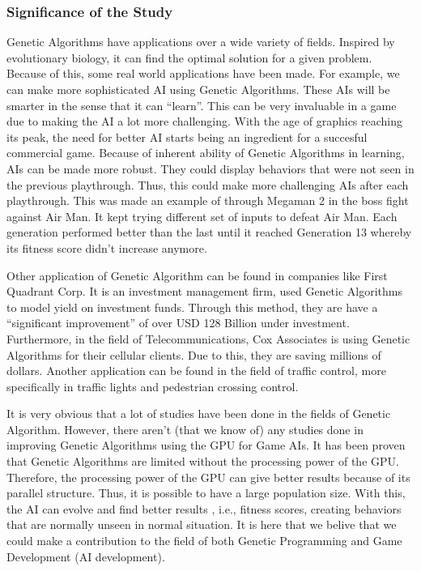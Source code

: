\subsubsection*{Significance of the Study}
Genetic Algorithms have applications over a wide variety of fields.
Inspired by evolutionary biology, it can find the optimal solution
for a given problem.  Because of this, some real world applications
have been made.  For example, we can make more sophisticated AI using 
Genetic Algorithms.  These AIs will be smarter in the sense that it can ``learn''.  
This can be very invaluable in a game due to making the AI a lot more challenging.  
With the age of graphics reaching its peak, the need for better AI starts being an
ingredient for a succesful commercial game\cite{Yue06}.  Because of inherent ability
of Genetic Algorithms in learning, AIs can be made more robust.  They could 
display behaviors that were not seen in the previous playthrough.  Thus, 
this could make more challenging AIs after each playthrough.  This was made an 
example of through Megaman 2 in the boss fight against Air Man.  It kept trying different 
set of inputs to defeat Air Man.  Each generation performed better than the last 
until it reached Generation 13 whereby its fitness score didn't increase anymore\cite{website:Kuliniewicz09}.  


Other application of Genetic Algorithm can be found in companies like First Quadrant Corp.
It is an investment management firm, used Genetic Algorithms to model yield on 
investment funds\cite{website:Davis}.  Through this method, they are have a ``significant improvement''
of over USD 128 Billion under investment\cite{website:Davis}.  Furthermore, in the field of Telecommunications, 
Cox Associates is using Genetic Algorithms for their cellular clients\cite{website:Davis}.  
Due to this, they are saving millions of dollars.  Another application can be found 
in the field of traffic control, more specifically in traffic lights and pedestrian crossing
control\cite{Turky09}.  

It is very obvious that a lot of studies have been done in the fields of Genetic Algorithm.
However, there aren't (that we know of) any studies done in improving Genetic Algorithms
using the GPU for Game AIs.  It has been proven that Genetic Algorithms are limited without
the processing power of the GPU\cite{Banzhaf09}.  Therefore, the processing power of the GPU can give better 
results because of its parallel structure.  Thus, it is possible to have a large population size.
With this, the AI can evolve and find better results , i.e., fitness scores, creating behaviors that are normally
unseen in normal situation.  It is here that we belive that we 
could make a contribution to the field of both Genetic Programming and Game Development (AI development).